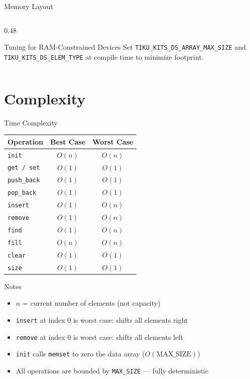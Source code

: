 \documentclass[aspectratio=169, 10pt]{beamer}
\begin{document}
\begin{frame}{Memory Layout}
\begin{columns}[T]
\begin{column}{0.48\textwidth}
\vspace{0.3em}
\begin{alertblock}{Tuning for RAM-Constrained Devices}
Set \texttt{TIKU\_KITS\_DS\_ARRAY\_MAX\_SIZE} and
\texttt{TIKU\_KITS\_DS\_ELEM\_TYPE} at compile time
to minimize footprint.
\end{alertblock}
\end{column}
\end{columns}
\end{frame}

\section{Complexity}

\begin{frame}{Time Complexity}
\begin{table}
\centering
\begin{tabular}{@{}lcc@{}}
\toprule
\textbf{Operation} & \textbf{Best Case} & \textbf{Worst Case} \\
\midrule
\texttt{init}       & $O(n)$ & $O(n)$ \\
\texttt{get / set}  & $O(1)$ & $O(1)$ \\
\texttt{push\_back} & $O(1)$ & $O(1)$ \\
\texttt{pop\_back}  & $O(1)$ & $O(1)$ \\
\texttt{insert}     & $O(1)$ & $O(n)$ \\
\texttt{remove}     & $O(1)$ & $O(n)$ \\
\texttt{find}       & $O(1)$ & $O(n)$ \\
\texttt{fill}       & $O(n)$ & $O(n)$ \\
\texttt{clear}      & $O(1)$ & $O(1)$ \\
\texttt{size}       & $O(1)$ & $O(1)$ \\
\bottomrule
\end{tabular}
\end{table}

\vspace{0.3em}
\begin{block}{Notes}
\begin{itemize}
  \item $n$ = current number of elements (not capacity)
  \item \texttt{insert} at index 0 is worst case: shifts all elements right
  \item \texttt{remove} at index 0 is worst case: shifts all elements left
  \item \texttt{init} calls \texttt{memset} to zero the data array ($O(\text{MAX\_SIZE})$)
  \item All operations are bounded by \texttt{MAX\_SIZE} --- fully deterministic
\end{itemize}
\end{block}
\end{frame}
\end{document}
